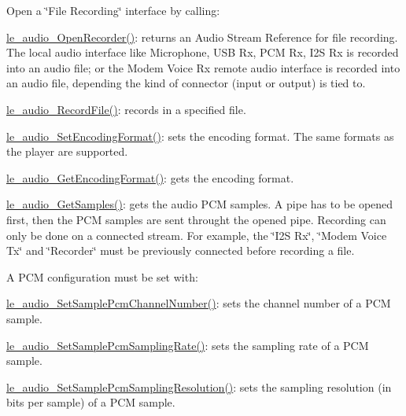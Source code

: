 Open a \char`\"{}\+File Recording\char`\"{} interface by calling\+:
\begin{DoxyItemize}
\item \hyperlink{le__audio__interface_8h_aeac35459c36748a4471b6d45f1ebeb24}{le\+\_\+audio\+\_\+\+Open\+Recorder()}\+: returns an Audio Stream Reference for file recording. The local audio interface like Microphone, U\+S\+B Rx, P\+C\+M Rx, I2\+S Rx is recorded into an audio file; or the Modem Voice Rx remote audio interface is recorded into an audio file, depending the kind of connector (input or output) is tied to.
\item \hyperlink{le__audio__interface_8h_a393a26f6cff7fe05c1813fcafeef50f3}{le\+\_\+audio\+\_\+\+Record\+File()}\+: records in a specified file.
\item \hyperlink{le__audio__interface_8h_aead87ec16d317bb4e4a8e7e9ea37550b}{le\+\_\+audio\+\_\+\+Set\+Encoding\+Format()}\+: sets the encoding format. The same formats as the player are supported.
\item \hyperlink{le__audio__interface_8h_a62e45a441a7d7ab5b7d20b41849331a2}{le\+\_\+audio\+\_\+\+Get\+Encoding\+Format()}\+: gets the encoding format.
\item \hyperlink{le__audio__interface_8h_a9c55a59849afcbb2ccef88cd4265782e}{le\+\_\+audio\+\_\+\+Get\+Samples()}\+: gets the audio P\+C\+M samples. A pipe has to be opened first, then the P\+C\+M samples are sent throught the opened pipe. Recording can only be done on a connected stream. For example, the \char`\"{}\+I2\+S Rx\char`\"{}, \char`\"{}\+Modem Voice Tx\char`\"{} and \char`\"{}\+Recorder\char`\"{} must be previously connected before recording a file.
\end{DoxyItemize}

A P\+C\+M configuration must be set with\+:
\begin{DoxyItemize}
\item \hyperlink{le__audio__interface_8h_aae7db9f0933119fb5a61162722b3274a}{le\+\_\+audio\+\_\+\+Set\+Sample\+Pcm\+Channel\+Number()}\+: sets the channel number of a P\+C\+M sample.
\item \hyperlink{le__audio__interface_8h_a04adfcc0e8f5796eca53c31cd5dd6528}{le\+\_\+audio\+\_\+\+Set\+Sample\+Pcm\+Sampling\+Rate()}\+: sets the sampling rate of a P\+C\+M sample.
\item \hyperlink{le__audio__interface_8h_aae37b46c13f76144dd94c48bfe94998b}{le\+\_\+audio\+\_\+\+Set\+Sample\+Pcm\+Sampling\+Resolution()}\+: sets the sampling resolution (in bits per sample) of a P\+C\+M sample.
\end{DoxyItemize}

